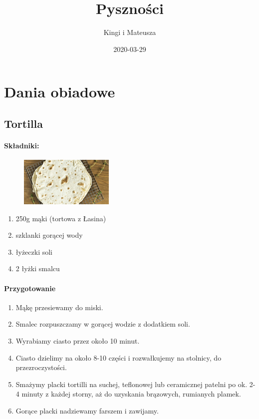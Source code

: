 \documentclass{article}
\title{Pyszności}
\author{Kingi i Mateusza}
\date{2020-03-29}
\begin{document}
    \maketitle
    \newpage

    \section{Dania obiadowe}
    \medskip
    \subsection{Tortilla}
    \bigskip
    \paragraph{Składniki:}
    \begin{figure}
        \includegraphics[width=0.4\textwidth]{tortilla.jpg}
    \end{figure}
    \begin{enumerate}
        \item 250g mąki (tortowa z Łasina)
        \item {} szklanki gorącej wody
        \item {} łyżeczki soli
        \item 2 łyżki smalcu
    \end{enumerate}

    \paragraph{Przygotowanie}
    \begin{enumerate}
        \item Mąkę przesiewamy do miski.
        \item Smalec rozpuszczamy w gorącej wodzie z dodatkiem soli.
        \item Wyrabiamy ciasto przez około 10 minut.
        \item Ciasto dzielimy na około 8-10 części i rozwałkujemy na stolnicy,
            do przezroczystości.
        \item Smażymy placki tortilli na suchej, teflonowej lub ceramicznej
            patelni po ok. 2-4 minuty z każdej storny, aż do uzyskania
            brązowych, rumianych plamek.
        \item Gorące placki nadziewamy farszem i zawijamy.
    \end{enumerate}
\end{document}
